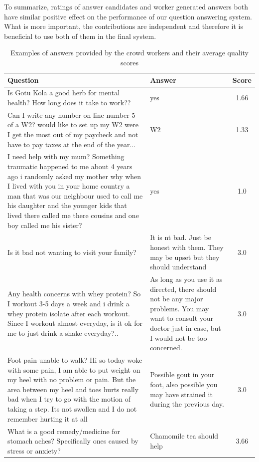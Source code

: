 To summarize, ratings of answer candidates and worker generated answers both have similar positive effect on the performance of our question answering system.
What is more important, the contributions are independent and therefore it is beneficial to use both of them in the final system.

\begin{table}[ht]
\centering
\begin{tabular}{| p{10.5cm} | p{5cm} | c |}
\hline
Question & Answer & Score \\
\hline
 Is Gotu Kola a good herb for mental health? How long does it take to work?? & yes & 1.66\\
 \hline
Can I write any number on line number 5 of a W2?  would like to set up my W2 were I get the most out of my paycheck and not have to pay taxes at the end of the year... & W2 & 1.33\\
 \hline
I need help with my mum? Something traumatic happened to me about 4 years ago i randomly asked my mother why when I lived with you in your home country a man that was our neighbour used to call me his daughter and the younger kids that lived there called me there cousins and one boy called me his sister? & yes & 1.0\\
\hline
\hline
 Is it bad not wanting to visit your family? & It is nt bad. Just be honest with them. They may be upset but they should understand & 3.0 \\
 \hline
Any health concerns with whey protein? So I workout 3-5 days a week and i drink a whey protein isolate after each workout. Since I workout almost everyday, is it ok for me to just drink a shake everyday?.. & As long as you use it as directed, there should not be any major problems.  You may want to consult your doctor just in case, but I would not be too concerned. & 3.0\\
\hline
Foot pain unable to walk? Hi so today woke with some pain, I am able to put weight on my heel with no problem or pain.  But  the area between my heel and toes hurts really bad when I try to go with the motion of taking a step. Its not swollen and I do not remember hurting it at all & Possible gout in your foot, also possible you may have strained it during the previous day. & 3.0\\
\hline
What is a good remedy/medicine for stomach aches? Specifically ones caused by stress or anxiety? & Chamomile tea should help & 3.66\\
\hline
\end{tabular}
\caption{Examples of answers provided by the crowd workers and their average quality scores}
\label{table:crowdsourcing:crqa:answer_examples}
\end{table}

